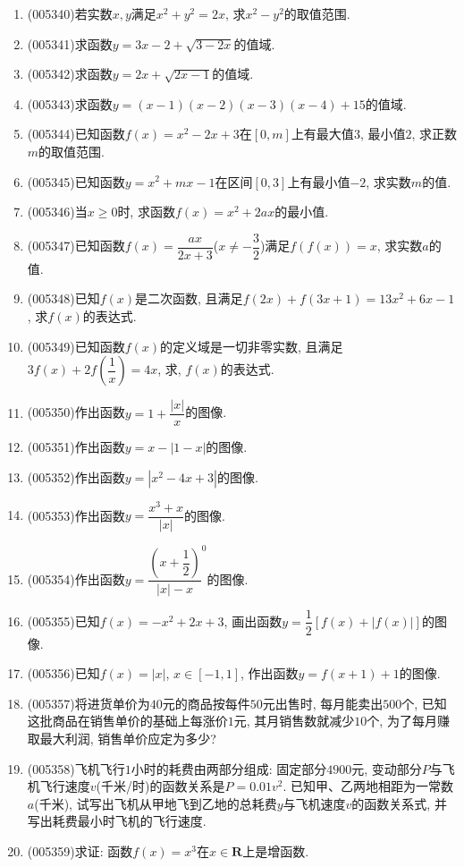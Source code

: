 \documentclass[10pt,a4paper]{article}
\begin{document}
\begin{enumerate}[1.]
\item {\tiny (005340)}若实数$x,y$满足$x^2+y^2=2x$, 求$x^2-y^2$的取值范围.
\item {\tiny (005341)}求函数$y=3x-2+\sqrt {3-2x}$的值域.
\item {\tiny (005342)}求函数$y=2x+\sqrt {2x-1}$的值域.
\item {\tiny (005343)}求函数$y=(x-1)(x-2)(x-3)(x-4)+15$的值域.
\item {\tiny (005344)}已知函数$f(x)=x^2-2x+3$在$[0,m]$上有最大值$3$, 最小值$2$, 求正数$m$的取值范围.
\item {\tiny (005345)}已知函数$y=x^2+mx-1$在区间$[0,3]$上有最小值$-2$, 求实数$m$的值.
\item {\tiny (005346)}当$x\ge 0$时, 求函数$f(x)=x^2+2ax$的最小值.
\item {\tiny (005347)}已知函数$f(x)=\dfrac{ax}{2x+3}$($x\ne -\dfrac 32$)满足$f(f(x))=x$, 求实数$a$的值.
\item {\tiny (005348)}已知$f(x)$是二次函数, 且满足$f(2x)+f(3x+1)=13x^2+6x-1$, 求$f(x)$的表达式.
\item {\tiny (005349)}已知函数$f(x)$的定义域是一切非零实数, 且满足$3f(x)+2f(\dfrac 1x)=4x$, 求, $f(x)$的表达式.
\item {\tiny (005350)}作出函数$y=1+\dfrac{|x|}x$的图像.
\item {\tiny (005351)}作出函数$y=x-|1-x|$的图像.
\item {\tiny (005352)}作出函数$y=|x^2-4x+3|$的图像.
\item {\tiny (005353)}作出函数$y=\dfrac{x^3+x}{|x|}$的图像.
\item {\tiny (005354)}作出函数$y=\dfrac{(x+\dfrac 12)}{|x|-x}^0$的图像.
\item {\tiny (005355)}已知$f(x)=-x^2+2x+3$, 画出函数$y=\dfrac 12[f(x)+|f(x)|]$的图像.
\item {\tiny (005356)}已知$f(x)=|x|$, $x\in [-1,1]$, 作出函数$y=f(x+1)+1$的图像.
\item {\tiny (005357)}将进货单价为$40$元的商品按每件$50$元出售时, 每月能卖出$500$个, 已知这批商品在销售单价的基础上每涨价$1$元, 其月销售数就减少$10$个, 为了每月赚取最大利润, 销售单价应定为多少?
\item {\tiny (005358)}飞机飞行$1$小时的耗费由两部分组成: 固定部分$4900$元, 变动部分$P$与飞机飞行速度$v$(千米/时)的函数关系是$P=0.01v^2$. 已知甲、乙两地相距为一常数$a$(千米), 试写出飞机从甲地飞到乙地的总耗费$y$与飞机速度$v$的函数关系式, 并写出耗费最小时飞机的飞行速度.
\item {\tiny (005359)}求证: 函数$f(x)=x^3$在$x\in \mathbf{R}$上是增函数.

\end{enumerate}
\end{document}
